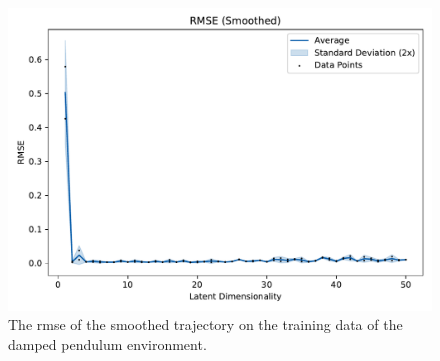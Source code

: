 			\begin{figure}
				\centering
				\includegraphics[width=0.7\linewidth]{figures/results/pendulum-damped/latent-dim/comparison-rmse-smoothed-mean-vs-latent-dim.pdf}
				\caption{The \ac{rmse} of the smoothed trajectory on the training data of the damped pendulum environment.}
				\label{fig:pendulumRmseSmoothed}
			\end{figure}

